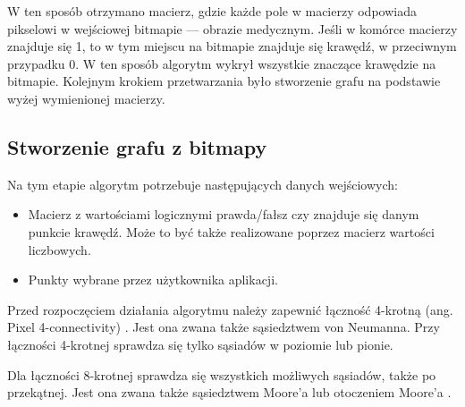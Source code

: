 \documentclass[a4paper,11pt,twoside]{report}
\theoremstyle{definition}
\begin{document}
W ten sposób otrzymano macierz, gdzie każde pole w macierzy odpowiada pikselowi w wejściowej bitmapie --- obrazie medycznym. Jeśli w komórce macierzy znajduje się 1, to w tym miejscu na bitmapie znajduje się krawędź, w przeciwnym przypadku 0. W ten sposób algorytm wykrył wszystkie znaczące krawędzie na bitmapie. Kolejnym krokiem przetwarzania było stworzenie grafu na podstawie wyżej wymienionej macierzy.

\subsection {Stworzenie grafu z bitmapy}

Na tym etapie algorytm potrzebuje następujących danych wejściowych:
\begin{itemize}[noitemsep]
\item Macierz z wartościami logicznymi prawda/fałsz czy znajduje się danym punkcie krawędź. Może to być także realizowane poprzez macierz wartości liczbowych.
\item Punkty wybrane przez użytkownika aplikacji.
\end{itemize}

Przed rozpoczęciem działania algorytmu należy zapewnić łączność 4-krotną (ang. Pixel 4-connectivity) \cite{Pixel connectivity}. Jest ona zwana także sąsiedztwem von Neumanna. Przy łączności 4-krotnej sprawdza się tylko sąsiadów w poziomie lub pionie.

\begin{center}
\end{center}

Dla łączności 8-krotnej sprawdza się wszystkich możliwych sąsiadów, także po przekątnej. Jest ona zwana także sąsiedztwem Moore'a lub otoczeniem Moore'a \cite{Moore}.

\begin{center}
\end{center}
\end{document}
